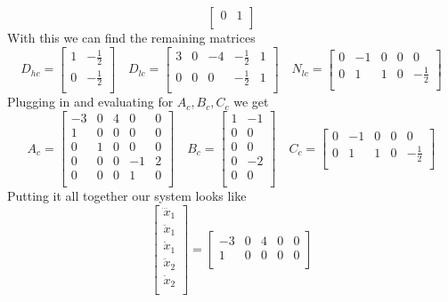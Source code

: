 \documentclass{article}
\begin{document}
\begin{enumerate}[(a)]
$$\begin{bmatrix}
0 & 1 \\
\end{bmatrix}
$$
With this we can find the remaining matrices
$$
D_{hc} =
\begin{bmatrix}
1 & -\frac{1}{2} \\
0 & -\frac{1}{2} \\
\end{bmatrix}
\quad
D_{lc} =
\begin{bmatrix}
3 & 0 & -4 & -\frac{1}{2} & 1 \\
0 & 0 &  0 & -\frac{1}{2} & 1 \\
\end{bmatrix}
\quad
N_{lc} =
\begin{bmatrix}
0 & -1 & 0 & 0 & 0 \\
0 & 1 & 1 & 0 & -\frac{1}{2} \\
\end{bmatrix}
$$
Plugging in and evaluating for $A_c, B_c, C_c$ we get
$$
A_c =
\begin{bmatrix}
-3 & 0 & 4 & 0 & 0 \\
1 & 0 & 0 & 0 & 0 \\
0 & 1 & 0 & 0 & 0 \\
0 & 0 & 0 & -1 & 2 \\
0 & 0 & 0 & 1 & 0 \\
\end{bmatrix}
\quad
B_c =
\begin{bmatrix}
1 & -1 \\
0 & 0 \\
0 & 0 \\
0 & -2 \\
0 & 0 \\
\end{bmatrix}
\quad
C_c =
\begin{bmatrix}
0 & -1 & 0 & 0 & 0 \\
0 & 1 & 1 & 0 & -\frac{1}{2} \\
\end{bmatrix}
$$
Putting it all together our system looks like
$$
\begin{bmatrix}
\dddot{x}_1 \\
\ddot{x}_1 \\
\dot{x}_1 \\
\ddot{x}_2 \\
\dot{x}_2 \\
\end{bmatrix}
=
\begin{bmatrix}
-3 & 0 & 4 & 0 & 0 \\
1 & 0 & 0 & 0 & 0 \\

\end{bmatrix}$$
\end{enumerate}
\end{document}
